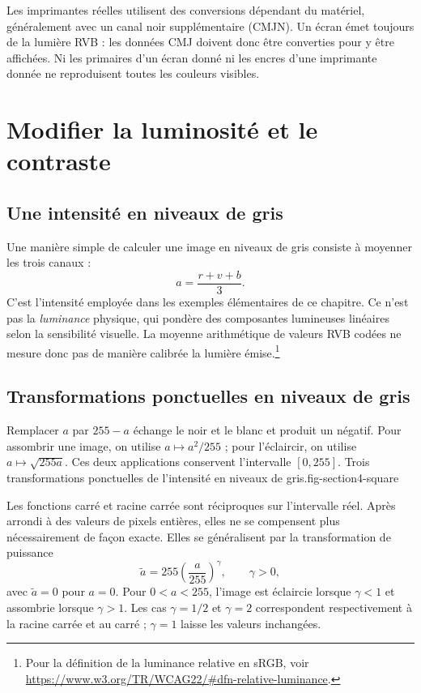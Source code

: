 Les imprimantes réelles utilisent des conversions dépendant du matériel, généralement avec un canal noir supplémentaire (CMJN). Un écran émet toujours de la lumière RVB : les données CMJ doivent donc être converties pour y être affichées. Ni les primaires d'un écran donné ni les encres d'une imprimante donnée ne reproduisent toutes les couleurs visibles.

\section{Modifier la luminosité et le contraste}
\subsection{Une intensité en niveaux de gris}
Une manière simple de calculer une image en niveaux de gris consiste à moyenner les trois canaux :
\[
 a=\frac{r+v+b}{3}.
\]
C'est l'intensité employée dans les exemples élémentaires de ce chapitre. Ce n'est pas la \emph{luminance} physique, qui pondère des composantes lumineuses linéaires selon la sensibilité visuelle. La moyenne arithmétique de valeurs RVB codées ne mesure donc pas de manière calibrée la lumière émise.\footnote{Pour la définition de la luminance relative en sRGB, voir \url{https://www.w3.org/TR/WCAG22/\#dfn-relative-luminance}.}

\subsection{Transformations ponctuelles en niveaux de gris}
Remplacer $a$ par $255-a$ échange le noir et le blanc et produit un négatif. Pour assombrir une image, on utilise $a\mapsto a^2/255$ ; pour l'éclaircir, on utilise $a\mapsto\sqrt{255a}$. Ces deux applications conservent l'intervalle $[0,255]$.
{Trois transformations ponctuelles de l'intensité en niveaux de gris.}{fig-section4-square}

Les fonctions carré et racine carrée sont réciproques sur l'intervalle réel. Après arrondi à des valeurs de pixels entières, elles ne se compensent plus nécessairement de façon exacte. Elles se généralisent par la transformation de puissance
\[
 \widetilde a=255\left(\frac a{255}\right)^\gamma,
 \qquad \gamma>0,
\]
avec $\widetilde a=0$ pour $a=0$. Pour $0<a<255$, l'image est éclaircie lorsque $\gamma<1$ et assombrie lorsque $\gamma>1$. Les cas $\gamma=1/2$ et $\gamma=2$ correspondent respectivement à la racine carrée et au carré ; $\gamma=1$ laisse les valeurs inchangées.

